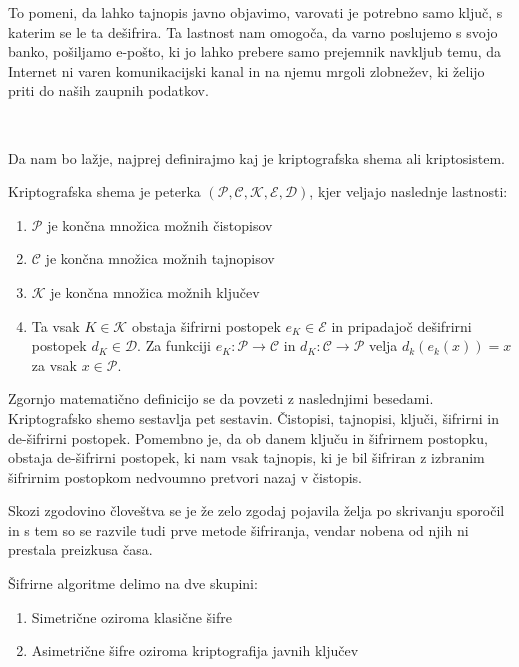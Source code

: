 \documentclass[12pt,a4paper,openany]{book}
\begin{document}
To pomeni, da lahko tajnopis javno objavimo, varovati je potrebno samo ključ, s katerim se le ta dešifrira. Ta lastnost nam omogoča, da varno poslujemo s svojo banko, pošiljamo e-pošto, ki jo lahko prebere samo prejemnik navkljub temu, da Internet ni varen komunikacijski kanal in na njemu mrgoli zlobnežev, ki želijo priti do naših zaupnih podatkov.

\

Da nam bo lažje, najprej definirajmo kaj je kriptografska shema ali kriptosistem.

\begin{mdframed}[frametitle={Kriptografska shema}]
Kriptografska shema je peterka  $(\mathcal{P}, \mathcal{C}, \mathcal{K},  \mathcal{E}, \mathcal{D})$, kjer veljajo naslednje lastnosti:
	\begin{enumerate}
		\item $\mathcal{P}$ je končna množica možnih čistopisov
		\item $\mathcal{C}$ je končna množica možnih tajnopisov
		\item $\mathcal{K}$ je končna množica možnih ključev
		\item Ta vsak $K \in \mathcal{K}$ obstaja šifrirni postopek $e_K \in \mathcal{E}$ in pripadajoč dešifrirni postopek $d_K \in \mathcal{D}$. Za funkciji $e_K: \mathcal{P} \rightarrow \mathcal{C}$ in $d_K: \mathcal{C} \rightarrow \mathcal{P}$ velja $d_k(e_k(x)) = x$ za vsak $x \in \mathcal{P}$.
	\end{enumerate}
\end{mdframed}

Zgornjo matematično definicijo se da povzeti z naslednjimi besedami. Kriptografsko shemo sestavlja pet sestavin. Čistopisi, tajnopisi, ključi, šifrirni in de-šifrirni postopek. Pomembno je, da ob danem ključu in šifrirnem postopku, obstaja de-šifrirni postopek, ki nam vsak tajnopis, ki je bil šifriran z izbranim šifrirnim postopkom nedvoumno pretvori nazaj v čistopis.

Skozi zgodovino človeštva se je že zelo zgodaj pojavila želja po skrivanju sporočil in s tem so se razvile tudi prve metode šifriranja, vendar nobena od njih ni prestala preizkusa časa.

Šifrirne algoritme delimo na dve skupini:
\begin{enumerate}

	\item Simetrične oziroma klasične šifre
	\item Asimetrične šifre oziroma kriptografija javnih ključev

\end{enumerate}
\end{document}
